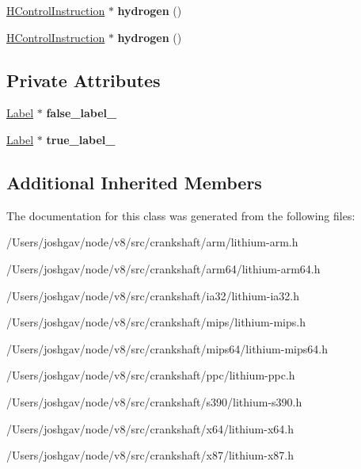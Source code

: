 \begin{DoxyCompactItemize}
\item 
\hyperlink{classv8_1_1internal_1_1_h_control_instruction}{H\+Control\+Instruction} $\ast$ {\bfseries hydrogen} ()\hypertarget{classv8_1_1internal_1_1_l_control_instruction_a4affc35e70d25589f0db7daa2bbca908}{}\label{classv8_1_1internal_1_1_l_control_instruction_a4affc35e70d25589f0db7daa2bbca908}

\item 
\hyperlink{classv8_1_1internal_1_1_h_control_instruction}{H\+Control\+Instruction} $\ast$ {\bfseries hydrogen} ()\hypertarget{classv8_1_1internal_1_1_l_control_instruction_a4affc35e70d25589f0db7daa2bbca908}{}\label{classv8_1_1internal_1_1_l_control_instruction_a4affc35e70d25589f0db7daa2bbca908}

\end{DoxyCompactItemize}
\subsection*{Private Attributes}
\begin{DoxyCompactItemize}
\item 
\hyperlink{classv8_1_1internal_1_1_label}{Label} $\ast$ {\bfseries false\+\_\+label\+\_\+}\hypertarget{classv8_1_1internal_1_1_l_control_instruction_aa76db7f474e211ca4487bc1ff3f8e493}{}\label{classv8_1_1internal_1_1_l_control_instruction_aa76db7f474e211ca4487bc1ff3f8e493}

\item 
\hyperlink{classv8_1_1internal_1_1_label}{Label} $\ast$ {\bfseries true\+\_\+label\+\_\+}\hypertarget{classv8_1_1internal_1_1_l_control_instruction_a4209598a71d2b290582122d2fafcaa5e}{}\label{classv8_1_1internal_1_1_l_control_instruction_a4209598a71d2b290582122d2fafcaa5e}

\end{DoxyCompactItemize}
\subsection*{Additional Inherited Members}


The documentation for this class was generated from the following files\+:\begin{DoxyCompactItemize}
\item 
/\+Users/joshgav/node/v8/src/crankshaft/arm/lithium-\/arm.\+h\item 
/\+Users/joshgav/node/v8/src/crankshaft/arm64/lithium-\/arm64.\+h\item 
/\+Users/joshgav/node/v8/src/crankshaft/ia32/lithium-\/ia32.\+h\item 
/\+Users/joshgav/node/v8/src/crankshaft/mips/lithium-\/mips.\+h\item 
/\+Users/joshgav/node/v8/src/crankshaft/mips64/lithium-\/mips64.\+h\item 
/\+Users/joshgav/node/v8/src/crankshaft/ppc/lithium-\/ppc.\+h\item 
/\+Users/joshgav/node/v8/src/crankshaft/s390/lithium-\/s390.\+h\item 
/\+Users/joshgav/node/v8/src/crankshaft/x64/lithium-\/x64.\+h\item 
/\+Users/joshgav/node/v8/src/crankshaft/x87/lithium-\/x87.\+h\end{DoxyCompactItemize}
